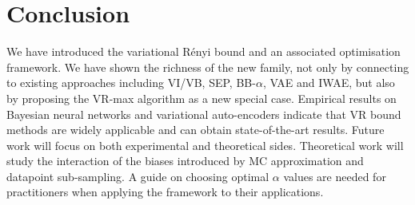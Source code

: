 \section{Conclusion}
We have introduced the variational R{\'e}nyi bound and an associated optimisation framework. We have shown the richness of the new family, not only by connecting to existing approaches including VI/VB, SEP, BB-$\alpha$, VAE and IWAE, but also by proposing the VR-max algorithm as a new special case. Empirical results on Bayesian neural networks and variational auto-encoders indicate that VR bound methods are widely applicable and can obtain state-of-the-art results.
%
Future work will focus on both experimental and theoretical sides. Theoretical work will study the interaction of the biases introduced by MC approximation and datapoint sub-sampling. A guide on choosing optimal $\alpha$ values are needed for practitioners when applying the framework to their applications.